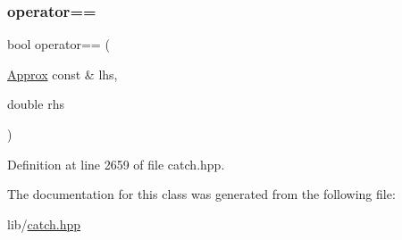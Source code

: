 \subsubsection{\texorpdfstring{operator==}{operator==}\hspace{0.1cm}{\footnotesize\ttfamily [2/2]}}
{\footnotesize\ttfamily bool operator== (\begin{DoxyParamCaption}\item[{\hyperlink{class_catch_1_1_detail_1_1_approx}{Approx} const \&}]{lhs,  }\item[{double}]{rhs }\end{DoxyParamCaption})\hspace{0.3cm}{\ttfamily [friend]}}



Definition at line 2659 of file catch.\+hpp.



The documentation for this class was generated from the following file\+:\begin{DoxyCompactItemize}
\item 
lib/\hyperlink{catch_8hpp}{catch.\+hpp}\end{DoxyCompactItemize}
